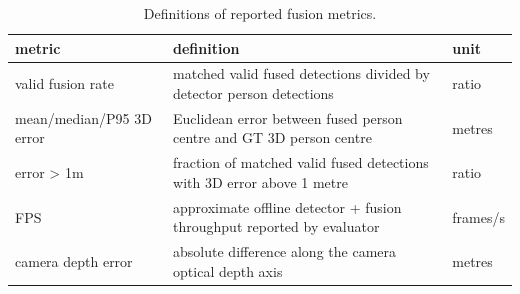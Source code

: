 \begin{table}[t]
\centering
\small
\begin{tabular}{lll}
\hline
metric & definition & unit \\
\hline
valid fusion rate & matched valid fused detections divided by detector person detections & ratio \\
mean/median/P95 3D error & Euclidean error between fused person centre and GT 3D person centre & metres \\
error > 1m & fraction of matched valid fused detections with 3D error above 1 metre & ratio \\
FPS & approximate offline detector + fusion throughput reported by evaluator & frames/s \\
camera depth error & absolute difference along the camera optical depth axis & metres \\
\hline
\end{tabular}
\caption{Definitions of reported fusion metrics.}
\label{tab:T5_metric_definitions}
\end{table}
